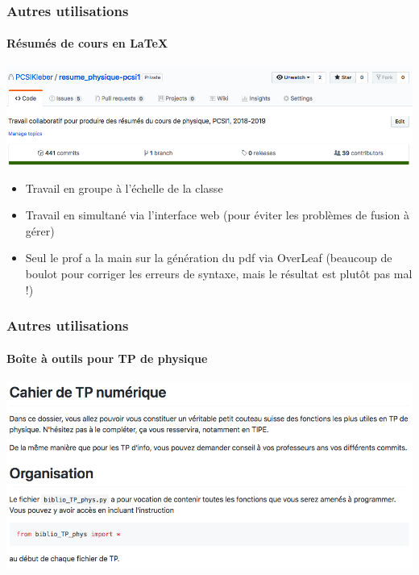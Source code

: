 \begin{frame}
	\frametitle{Autres utilisations}
	\framesubtitle{Résumés de cours en \LaTeX}

	\begin{center}
		\includegraphics[width=\linewidth]{figures/resumes_physique.png}
	\end{center}
	\begin{itemize}[<+->]
		\item Travail en groupe à l'échelle de la classe

		\item Travail en simultané via l'interface web (pour éviter les problèmes de fusion à gérer)

		\item Seul le prof a la main sur la génération du pdf via OverLeaf (beaucoup de boulot pour corriger les erreurs de syntaxe, mais le résultat est plutôt pas mal !)
	\end{itemize}
\end{frame}


\begin{frame}
	\frametitle{Autres utilisations}
	\framesubtitle{Boîte à outils pour TP de physique}

	\begin{center}
		\includegraphics[width=\linewidth]{figures/cahier_de_TP.png}
	\end{center}
\end{frame}

